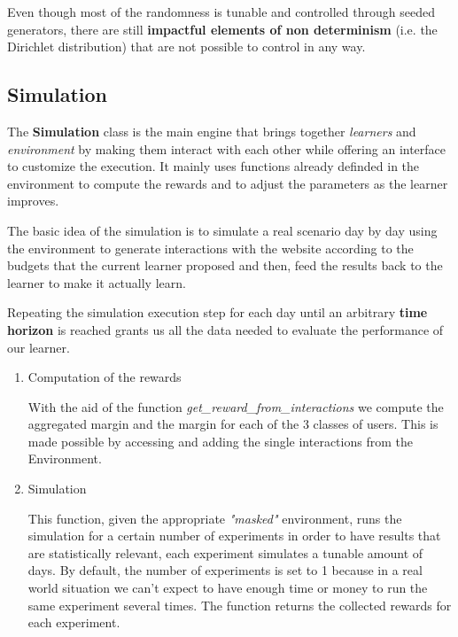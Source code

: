 Even though most of the randomness is tunable and controlled through seeded generators, there are still \textbf{impactful elements of non determinism} (i.e. the Dirichlet distribution) that are not possible to control in any way.

\subsection{Simulation}

The \textbf{Simulation} class is the main engine that brings together \textit{learners} and \textit{environment} by making them interact with each other while offering an interface to customize the execution. It mainly uses functions already definded in the environment to compute the rewards and to adjust the parameters as the learner improves.

The basic idea of the simulation is to simulate a real scenario day by day using the environment to generate interactions with the website according to the budgets that the current learner proposed and then, feed the results back to the learner to make it actually learn.

Repeating the simulation execution step for each day until an arbitrary \textbf{time horizon} is reached grants us all the data needed to evaluate the performance of our learner.

\begin{enumerate}
    \item Computation of the rewards

    With the aid of the function \textit{get\_reward\_from\_interactions} we compute the aggregated margin and the margin for each of the 3 classes of users. This is made possible by accessing and adding the single interactions from the Environment.

    \item Simulation

    This function, given the appropriate \textit{"masked"} environment, runs the simulation for a certain number of experiments in order to have results that are statistically relevant, each experiment simulates a tunable amount of days. By default, the number of experiments is set to 1 because in a real world situation we can't expect to have enough time or money to run the same experiment several times. The function returns the collected rewards for each experiment.
\end{enumerate}

